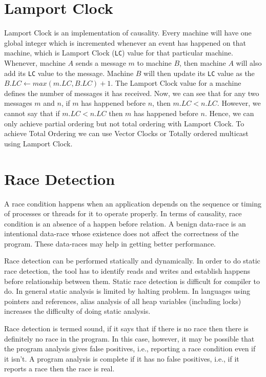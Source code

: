\documentclass[twoside]{article}
\begin{document}
\section{Lamport Clock}
Lamport Clock is an implementation of causality. Every machine will have
one global integer which is incremented whenever an event has happened on that 
machine, which is Lamport Clock (\texttt{LC}) value for that particular machine.
Whenever, machine $A$ sends a message $m$ to machine $B$, then machine
$A$ will also add its \texttt{LC} value to the message. Machine $B$ will then
update its \texttt{LC} value as the $B.LC \gets max (m.LC, B.LC) + 1$. 
The Lamport Clock value for a machine defines the number of messages it has
received. Now, we can see that for any two messages $m$ and $n$, if 
$m$ has happened before $n$, then $m.LC < n.LC$. However, we cannot say
that if $m.LC < n.LC$ then $m$ has happened before $n$. Hence, we can only
achieve partial ordering but not total ordering with Lamport Clock.
To achieve Total Ordering we can use Vector Clocks or Totally ordered multicast
using Lamport Clock.

\section{Race Detection}
A race condition happens when an application depends on the sequence or timing
of processes or threads for it to operate properly. In terms of causality,
race condition is an absence of a happen before relation. A benign data-race
is an intentional data-race whose existence does not affect the correctness 
of the program. These data-races may help in getting better performance. 

Race detection can be performed statically and dynamically. In order to
do static race
detection, the tool has to identify reads and writes and establish 
happens before relationship between them. Static race
detection is difficult for compiler to do. In general static analysis is
limited by halting problem. In languages using pointers and references,
alias analysis of all heap variables (including locks) increases the 
difficulty of doing static analysis.

Race detection is termed sound, if it says that if there is no race
then there is definitely no race in the program. In this case, however, 
it may be possible that the program analysis gives false positives, i.e.,
reporting a race condition even if it isn't. A program analysis is complete
if it has no false positives, i.e., if it reports a race then the race is real.
\end{document}
